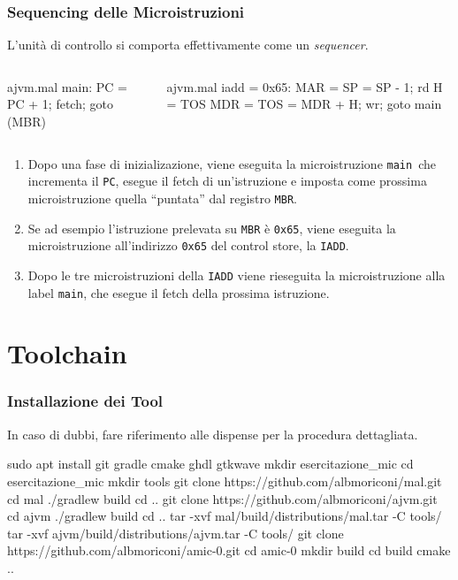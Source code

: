 \documentclass{beamer}
\begin{document}
\begin{frame}[fragile]
  \frametitle{Sequencing delle Microistruzioni}
  L'unità di controllo si comporta effettivamente come un \textit{sequencer}.
  \begin{columns}
    \begin{column}{0.5\textwidth}
\begin{myvhdl}{ajvm.mal}
main:
    PC = PC + 1; fetch; goto (MBR)
\end{myvhdl}
\end{column}
\begin{column}{0.5\textwidth}
\begin{myvhdl}{ajvm.mal}
iadd = 0x65:
    MAR = SP = SP - 1; rd
    H = TOS
    MDR = TOS = MDR + H; wr; goto main
\end{myvhdl}
\end{column}
\end{columns}
\begin{enumerate}
  \item Dopo una fase di inizializazione, viene eseguita la microistruzione
  \lstinline{main} che incrementa il \lstinline{PC}, esegue il fetch di
  un'istruzione e imposta come prossima microistruzione quella ``puntata'' dal
  registro \lstinline{MBR}.
  \item Se ad esempio l'istruzione prelevata su \lstinline{MBR} è
  \lstinline{0x65}, viene eseguita la microistruzione all'indirizzo
  \lstinline{0x65} del control store, la \lstinline{IADD}.
  \item Dopo le tre microistruzioni della \lstinline{IADD} viene rieseguita la
  microistruzione alla label \lstinline{main}, che esegue il fetch della
  prossima istruzione.
\end{enumerate}
\end{frame}

\section{Toolchain}
\begin{frame}[fragile]
  \frametitle{Installazione dei Tool}
  In caso di dubbi, fare riferimento alle dispense per la procedura dettagliata.
\begin{commandshell}
sudo apt install git gradle cmake ghdl gtkwave
mkdir esercitazione_mic
cd esercitazione_mic
mkdir tools
git clone https://github.com/albmoriconi/mal.git
cd mal
./gradlew build
cd ..
git clone https://github.com/albmoriconi/ajvm.git
cd ajvm
./gradlew build
cd ..
tar -xvf mal/build/distributions/mal.tar -C tools/
tar -xvf ajvm/build/distributions/ajvm.tar -C tools/
git clone https://github.com/albmoriconi/amic-0.git
cd amic-0
mkdir build
cd build
cmake ..
\end{commandshell}
\end{frame}
\end{document}
